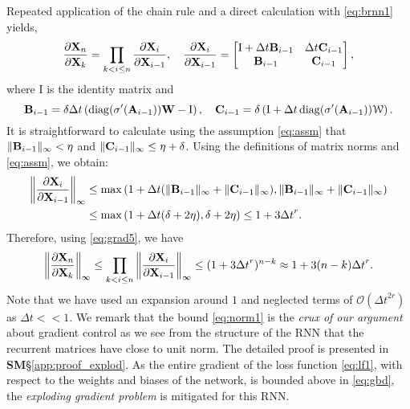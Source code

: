 \documentclass{article} \usepackage{iclr2021_conference,times}
\DeclareMathOperator{\diag}{diag}
\newcommand{\cW}{\EuScript{W}}
\newcommand{\bW}{{\bf W}}
\newcommand{\bA}{{\bf A}}
\newcommand{\bX}{{\bf X}}
\newcommand{\bB}{{\bf B}}
\newcommand{\bC}{{\bf C}}
\newcommand{\Dt}{{\Delta t}}
\newcommand{\ind}{\mathrm{I}}
\begin{document}
Repeated application of the chain rule and a direct calculation with \eqref{eq:brnn1} yields,
\begin{equation}
\label{eq:grad5}
 \frac{\partial \bX_n}{\partial \bX_k} = \prod\limits_{k < i \leq n} \frac{\partial \bX_i}{\partial \bX_{i-1}}, \quad \frac{\partial \bX_i}{\partial \bX_{i-1}} = 
 \begin{bmatrix}
 \ind + \Dt \bB_{i-1} & \Dt \bC_{i-1} \\
 \bB_{i-1} & \bC_{i-1} 
 \end{bmatrix},
\end{equation}
where $\ind$ is the identity matrix and 
\begin{equation}
\label{eq:grad7}
\bB_{i-1} = \delta\Dt\left(\diag(\sigma^{\prime}(\bA_{i-1})) \bW-\ind\right), \quad \bC_{i-1} = \delta\left(\ind +  \Dt\diag(\sigma^{\prime}(\bA_{i-1}))\cW\right).
\end{equation}
It is straightforward to calculate using the assumption \eqref{eq:assm} that $\|\bB_{i-1}\|_{\infty} < \eta$ and $\|\bC_{i-1}\|_{\infty} \leq \eta + \delta$. Using the definitions of matrix norms and \eqref{eq:assm}, we obtain:
\begin{equation}
\label{eq:norm1}
\begin{aligned}
\left \| \frac{\partial \bX_i}{\partial \bX_{i-1}} \right\|_\infty &\leq \max \left( 1 + \Dt (\|\bB_{i-1}\|_\infty + \|\bC_{i-1}\|_\infty), \|\bB_{i-1}\|_\infty + \|\bC_{i-1}\|_\infty \right) \\
&  \leq \max \left( 1+\Dt(\delta + 2 \eta), \delta + 2\eta \right) \leq  1 + 3\Dt^r.
\end{aligned}
\end{equation}
Therefore, using \eqref{eq:grad5}, we have 
\begin{equation}
\label{eq:norm2}
\left \| \frac{\partial \bX_n}{\partial \bX_{k}} \right\|_\infty \leq \prod\limits_{k < i \leq n} \left \| \frac{\partial \bX_i}{\partial \bX_{i-1}} \right\|_\infty \leq (1 + 3\Dt^r)^{n-k} \approx 1 + 3(n-k)\Dt^r.
\end{equation}
Note that we have used an expansion around $1$ and neglected terms of ${\mathcal O}(\Dt^{2r})$ as $\Dt << 1$. We remark that the bound \eqref{eq:norm1} is the \emph{crux of our argument} about gradient control as we see from the structure of the RNN that the recurrent matrices have close to unit norm. The detailed proof is presented in {\bf SM}\S\ref{app:proof_explod}. As the entire gradient of the loss function \eqref{eq:lf1}, with respect to the weights and biases of the network, is bounded above in \eqref{eq:gbd}, the \emph{exploding gradient problem} is mitigated for this RNN.
\end{document}
